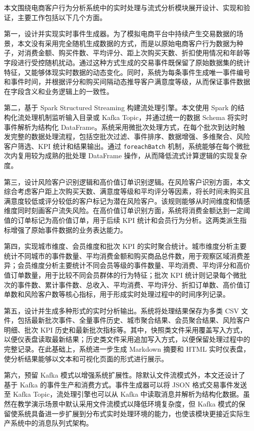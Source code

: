 \documentclass[12pt,hyperref,a4paper,UTF8]{ctexart}
\begin{document}
本文围绕电商客户行为分析系统中的实时处理与流式分析模块展开设计、实现和验证，主要工作包括以下几个方面。

第一，设计并实现实时事件生成器。为了模拟电商平台中持续产生交易数据的场景，本文没有采用完全随机生成数据的方式，而是以原始电商客户行为数据为种子，对消费金额、购买件数、平均评分、距上次购买天数、折扣使用情况和年龄等字段进行受控随机扰动。通过这种方式生成的交易事件既保留了原始数据集的统计特征，又能够体现实时数据的动态变化。同时，系统为每条事件生成唯一事件编号和事件时间，并根据评分和购买间隔动态推导客户满意度等级，从而保证事件数据在字段含义和业务逻辑上的一致性。

第二，基于 Spark Structured Streaming 构建流处理引擎。本文使用 Spark 的结构化流处理机制监听输入目录或 Kafka Topic，并通过统一的数据 Schema 将实时事件解析为结构化 DataFrame。系统采用微批次处理方式，在每个批次到达时触发完整的数据处理流程，包括空批次过滤、事件排序、数据增强、多维聚合、风险客户筛选、KPI 统计和结果输出。通过 \texttt{foreachBatch} 机制，系统能够在每个微批次内复用较为成熟的批处理 DataFrame 操作，从而降低流式计算逻辑的实现复杂度。

第三，设计风险客户识别逻辑和高价值订单识别逻辑。在风险客户识别方面，本文综合考虑客户距上次购买天数、满意度等级和平均评分等因素，将长时间未购买且满意度较低或评分较低的客户标记为潜在风险客户。该规则能够从时间维度和情感维度同时刻画客户流失风险。在高价值订单识别方面，系统将消费金额达到一定阈值的订单标记为高价值订单，用于后续 KPI 统计和会员行为分析。这两类派生指标增强了原始事件数据的业务表达能力。

第四，实现城市维度、会员维度和批次 KPI 的实时聚合统计。城市维度分析主要统计不同城市的事件数量、平均消费金额和购买商品总件数，用于观察区域消费差异；会员维度分析主要统计不同会员等级的事件数量、平均消费、平均评分和高价值订单数量，用于比较不同会员群体的行为特征；批次 KPI 统计则记录每个微批次的事件数、累计事件数、总收入、平均消费、平均评分、折扣订单数、高价值订单数和风险客户数等核心指标，用于形成实时处理过程中的时间序列记录。

第五，设计并生成多种形式的实时分析输出。系统将处理结果保存为多类 CSV 文件，包括最新批次事件、全量事件历史、城市聚合结果、会员聚合结果、风险客户明细、批次 KPI 历史和最新批次指标等。其中，快照类文件采用覆盖写入方式，以便仪表盘读取最新结果；历史类文件采用追加写入方式，以便保留处理过程中的完整记录。在此基础上，系统进一步生成 Markdown 摘要和 HTML 实时仪表盘，使分析结果能够以文本和可视化页面的形式进行展示。

第六，预留 Kafka 模式以增强系统扩展性。除默认文件流模式外，本文还设计了基于 Kafka 的事件生产和消费方式。事件生成器可以将 JSON 格式交易事件发送至 Kafka Topic，流处理引擎也可以从 Kafka 中读取消息并解析为结构化数据。虽然在教学演示场景中默认采用文件流模式以降低环境复杂度，但 Kafka 模式的保留使系统具备进一步扩展到分布式实时处理环境的能力，也使该模块更接近实际生产系统中的消息队列式架构。
\end{document}
